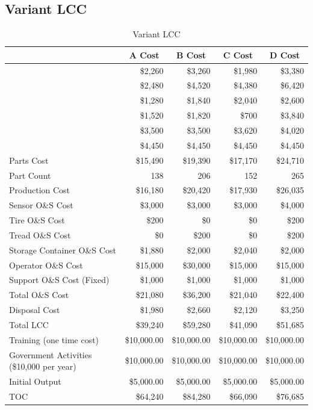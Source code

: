 \documentclass[letterpaper,10pt]{article}
\newcommand*{\myalign}[2]{\multicolumn{1}{#1}{#2}}
\begin{document}
\pagebreak
\subsection{Variant LCC}

\begin{table}[h!tbp]
	\begin{center}
		\begin{tabular}{lrrrr}
			\hline
			& \myalign{c}{\textbf{A Cost}} & \myalign{c}{\textbf{B Cost}}& \myalign{c}{\textbf{C Cost}}& \myalign{c}{\textbf{D Cost}} \\
			\hline\hline
			& \$2,260 &	\$3,260 &	\$1,980 &	\$3,380 \\
			& \$2,480 &	\$4,520 &	\$4,380 &	\$6,420 \\
			& \$1,280 &	\$1,840 &	\$2,040 &	\$2,600 \\
			& \$1,520 &	\$1,820 &	\$700 &	\$3,840 \\
			& \$3,500 &	\$3,500 &	\$3,620 &	\$4,020 \\
			& \$4,450 &	\$4,450 &	\$4,450 &	\$4,450 \\
			\hline
			Parts Cost &	\$15,490 &	\$19,390 &	\$17,170 &	\$24,710 \\
			Part Count &	138 &	206 &	152 &	265 \\
			Production Cost &	\$16,180 &	\$20,420 &	\$17,930 &	\$26,035 \\
			Sensor O\&S Cost &	\$3,000 &	\$3,000 &	\$3,000 &	\$4,000 \\
			Tire O\&S Cost &	\$200 &	\$0 &	\$0 &	\$200 \\
			Tread O\&S Cost &	\$0 &	\$200 &	\$0 &	\$200 \\
			Storage Container O\&S Cost &	\$1,880 &	\$2,000 &	\$2,040 &	\$2,000 \\
			Operator O\&S Cost &	\$15,000 &	\$30,000 &	\$15,000 &	\$15,000 \\
			Support O\&S Cost (Fixed) &	\$1,000 &	\$1,000 &	\$1,000 &	\$1,000 \\
			Total O\&S Cost &	\$21,080 &	\$36,200 &	\$21,040 &	\$22,400 \\
			Disposal Cost &	\$1,980 &	\$2,660 &	\$2,120 &	\$3,250 \\
			Total LCC &	\$39,240 &	\$59,280 &	\$41,090 &	\$51,685 \\
			\hline
			Training (one time cost) &	\$10,000.00 &	\$10,000.00 &	\$10,000.00 &	\$10,000.00 \\
			Government Activities (\$10,000 per year) &	\$10,000.00 &	\$10,000.00 &	\$10,000.00 &	\$10,000.00 \\
			Initial Output &	\$5,000.00 &	\$5,000.00 &	\$5,000.00 &	\$5,000.00 \\
			\hline
			TOC &	\$64,240 &	\$84,280 &	\$66,090 &	\$76,685 \\
			\hline
		\end{tabular}
	\end{center}
	\caption{Variant LCC}
	\label{tab:variantlcc}
\end{table}
\end{document}
